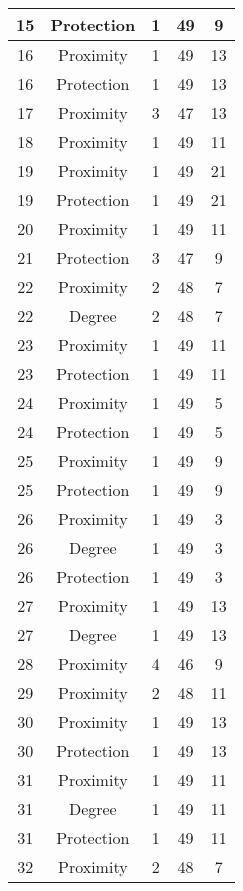 \documentclass[results.tex]{subfiles}
\begin{document}
\begin{center}
\begin{tabular}{| c || c | c | c | c |}
    \hline
    15 & Protection & 1 & 49 & 9 \\ 
    \hline
    16 & Proximity & 1 & 49 & 13 \\ 
    \hline
    16 & Protection & 1 & 49 & 13 \\ 
    \hline
    17 & Proximity & 3 & 47 & 13 \\ 
    \hline
    18 & Proximity & 1 & 49 & 11 \\ 
    \hline
    19 & Proximity & 1 & 49 & 21 \\ 
    \hline
    19 & Protection & 1 & 49 & 21 \\ 
    \hline
    20 & Proximity & 1 & 49 & 11 \\ 
    \hline
    21 & Protection & 3 & 47 & 9 \\ 
    \hline
    22 & Proximity & 2 & 48 & 7 \\ 
    \hline
    22 & Degree & 2 & 48 & 7 \\ 
    \hline
    23 & Proximity & 1 & 49 & 11 \\ 
    \hline
    23 & Protection & 1 & 49 & 11 \\ 
    \hline
    24 & Proximity & 1 & 49 & 5 \\ 
    \hline
    24 & Protection & 1 & 49 & 5 \\ 
    \hline
    25 & Proximity & 1 & 49 & 9 \\ 
    \hline
    25 & Protection & 1 & 49 & 9 \\ 
    \hline
    26 & Proximity & 1 & 49 & 3 \\ 
    \hline
    26 & Degree & 1 & 49 & 3 \\ 
    \hline
    26 & Protection & 1 & 49 & 3 \\ 
    \hline
    27 & Proximity & 1 & 49 & 13 \\ 
    \hline
    27 & Degree & 1 & 49 & 13 \\ 
    \hline
    28 & Proximity & 4 & 46 & 9 \\ 
    \hline
    29 & Proximity & 2 & 48 & 11 \\ 
    \hline
    30 & Proximity & 1 & 49 & 13 \\ 
    \hline
    30 & Protection & 1 & 49 & 13 \\ 
    \hline
    31 & Proximity & 1 & 49 & 11 \\ 
    \hline
    31 & Degree & 1 & 49 & 11 \\ 
    \hline
    31 & Protection & 1 & 49 & 11 \\ 
    \hline
    32 & Proximity & 2 & 48 & 7 \\ 

\end{tabular}
\end{center}
\end{document}
